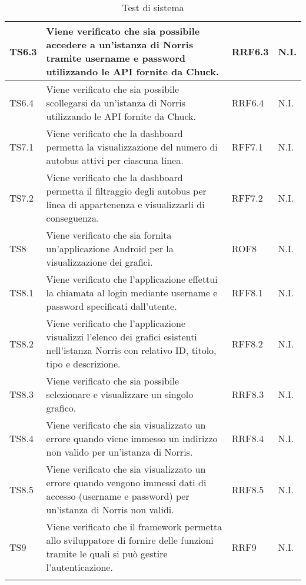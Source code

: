 \begin{longtabu}{| X[0.5] | X | X[0.5] | X[0.4] |}
TS6.3 & Viene verificato che sia possibile accedere a un'istanza di Norris tramite username e password utilizzando le API fornite da Chuck. & RRF6.3 & N.I.\\ \hline

TS6.4 & Viene verificato che sia possibile scollegarsi da un'istanza di Norris utilizzando le API fornite da Chuck. & RRF6.4 & N.I.\\ \hline

TS7.1 & Viene verificato che la dashboard permetta la visualizzazione del numero di autobus attivi per ciascuna linea. & RFF7.1 & N.I.\\ \hline

TS7.2 & Viene verificato che la dashboard permetta il filtraggio degli autobus per linea di appartenenza e visualizzarli di conseguenza. & RFF7.2 & N.I.\\ \hline

TS8 & Viene verificato che sia fornita un'applicazione Android per la visualizzazione dei grafici. & ROF8 & N.I.\\ \hline

TS8.1 & Viene verificato che l'applicazione effettui la chiamata al login mediante username e password specificati dall'utente. & RFF8.1 & N.I.\\ \hline

TS8.2 & Viene verificato che l'applicazione visualizzi l'elenco dei grafici esistenti nell'istanza Norris con relativo ID, titolo, tipo e descrizione. & RFF8.2 & N.I.\\ \hline

TS8.3 & Viene verificato che sia possibile selezionare e visualizzare un singolo grafico. & RRF8.3 & N.I.\\ \hline

TS8.4 & Viene verificato che sia visualizzato un errore quando viene immesso un indirizzo non valido per un'istanza di Norris. & RRF8.4 & N.I.\\ \hline

TS8.5 & Viene verificato che sia visualizzato un errore quando vengono immessi dati di accesso (username e password) per un'istanza di Norris non validi. & RRF8.5 & N.I.\\ \hline

TS9 & Viene verificato che il framework permetta allo sviluppatore di fornire delle funzioni tramite le quali si può gestire l'autenticazione. & RRF9 & N.I.\\ \hline

\caption{Test di sistema}

\end{longtabu}
